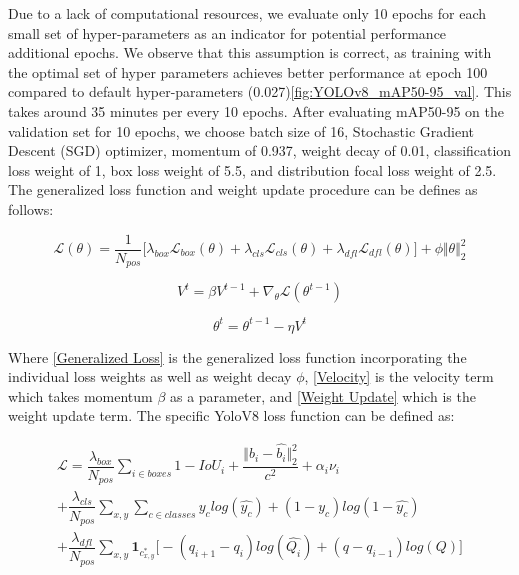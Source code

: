 \documentclass[10pt,twocolumn,letterpaper]{article}
\begin{document}
Due to a lack of computational resources, we evaluate only 10 epochs for each small set of hyper-parameters as an indicator for potential performance additional epochs. We observe that this assumption is correct, as training with the optimal set of hyper parameters achieves better performance at epoch 100 compared to default hyper-parameters (0.027)\ref{fig:YOLOv8_mAP50-95_val}. This takes around 35 minutes per every 10 epochs. After evaluating mAP50-95 on the validation set for 10 epochs, we choose batch size of 16, Stochastic Gradient Descent (SGD) optimizer, momentum of 0.937, weight decay of 0.01, classification loss weight of 1, box loss weight of 5.5, and distribution focal loss weight of 2.5. The generalized loss function and weight update procedure can be defines as follows:


\begin{equation}\label{Generalized Loss}
\mathcal{L}(\theta) = \dfrac{1}{N_{pos}}\Big[\lambda_{box}\mathcal{L}_{box}(\theta) + \lambda_{cls}\mathcal{L}_{cls}(\theta) + \lambda_{dfl}\mathcal{L}_{dfl}(\theta)\Big] + \phi\Vert \theta \Vert_2^2
\end{equation}

\begin{equation}\label{Velocity}
V^t = \beta V^{t-1} + \nabla_{\theta}\mathcal{L}(\theta^{t-1})
\end{equation}

\begin{equation}\label{Weight Update}
\theta^{t} = \theta^{t-1} - \eta V^{t}
\end{equation}

Where \ref{Generalized Loss} is the generalized loss function incorporating the individual loss weights as well as weight decay $\phi$, \ref{Velocity} is the velocity term which takes momentum $\beta$ as a parameter, and \ref{Weight Update} which is the weight update term. The specific YoloV8 loss function can be defined as:

\begin{multline}
\mathcal{L} = \dfrac{\lambda_{box}}{N_{pos}}\sum_{i\in boxes}1 - IoU_{i} + \dfrac{\Vert b_{i} - \hat{b_{i}} \Vert_2^2}{c^2} + \alpha_i\nu_i\ \\  + \dfrac{\lambda_{cls}}{N_{pos}}\sum_{x,y}\sum_{c\in classes}y_clog(\hat{y_c}) + (1 - y_c)log(1 - \hat{y_c}) \\
+ \dfrac{\lambda_{dfl}}{N_{pos}}\sum_{x,y}\mathbf{1}_{c^*_{x,y}}\Big[-(q_{i+1} - q_{i})log(\hat{Q_{i}}) + (q - q_{i-1})log(Q)\Big]
\end{multline}
\end{document}
